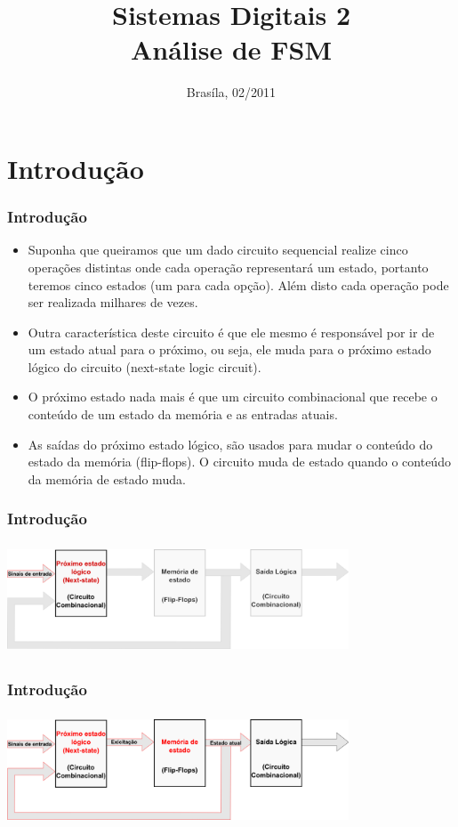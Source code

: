 \documentclass{beamer}
\title{Sistemas Digitais 2\\ \textbf{Análise de FSM}}
\date{Brasíla, 02/2011}
\institute{\textbf{Universidade de Brasília - Faculdade do Gama}}
\begin{document}
\begin{frame}
  \titlepage
\end{frame}
  
\section{Introdução}
  \begin{frame}
    \frametitle{Introdução}
    \begin{itemize}
      \item Suponha que queiramos que um dado circuito sequencial realize cinco operações distintas onde cada operação representará um estado, 
	    portanto teremos cinco estados (um para cada opção). Além disto cada operação pode ser realizada milhares de vezes. \pause
      \item Outra característica deste circuito é que ele mesmo é responsável por ir de um estado atual para o próximo, ou seja, ele muda para 
	    o próximo estado lógico do circuito (next-state logic circuit).\pause
      \item O próximo estado nada mais é que um circuito combinacional que recebe o conteúdo de um estado da memória e as entradas atuais.\pause
      \item As saídas do próximo estado lógico, são usados para mudar o conteúdo do estado da memória (flip-flops). O circuito muda de estado quando 
	    o conteúdo da memória de estado muda.
    \end{itemize}
  \end{frame}

  \begin{frame}
    \frametitle{Introdução}
    \includegraphics[height=1.3in, width=4in]{modelo_1.png}
  \end{frame}

  \begin{frame}
    \frametitle{Introdução}
    \includegraphics[height = 1.3in, width = 4in]{modelo_2.png}
  \end{frame}
\end{document}
